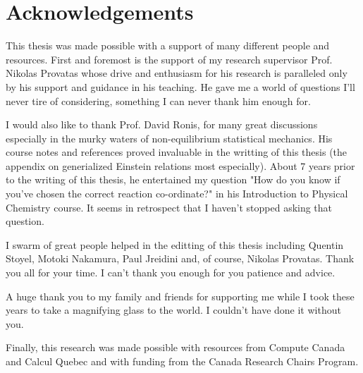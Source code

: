 \section*{Acknowledgements}
\label{sec:acknowledgements}

This thesis was made possible with a support of many different people and
resources. First and foremost is the support of my research supervisor Prof.
Nikolas Provatas whose drive and enthusiasm for his research is paralleled only
by his support and guidance in his teaching. He gave me a world of questions
I'll never tire of considering, something I can never thank him enough for.  

I would also like to thank Prof. David Ronis, for many great discussions
especially in the murky waters of non-equilibrium statistical mechanics.  His
course notes and references proved invaluable in the writting of this thesis
(the appendix on generialized Einstein relations most especially).  About 7
years prior to the writing of this thesis, he entertained my question "How do
you know if you've chosen the correct reaction co-ordinate?" in his
Introduction to Physical Chemistry course. It seems in retrospect that I
haven't stopped asking that question.

I swarm of great people helped in the editting of this thesis including Quentin
Stoyel, Motoki Nakamura, Paul Jreidini and, of course, Nikolas Provatas. Thank
you all for your time. I can't thank you enough for you patience and advice.

A huge thank you to my family and friends for supporting me while I took these
years to take a magnifying glass to the world. I couldn't have done it without
you.

Finally, this research was made possible with resources from Compute Canada and
Calcul Quebec and with funding from the Canada Research Chairs Program.

